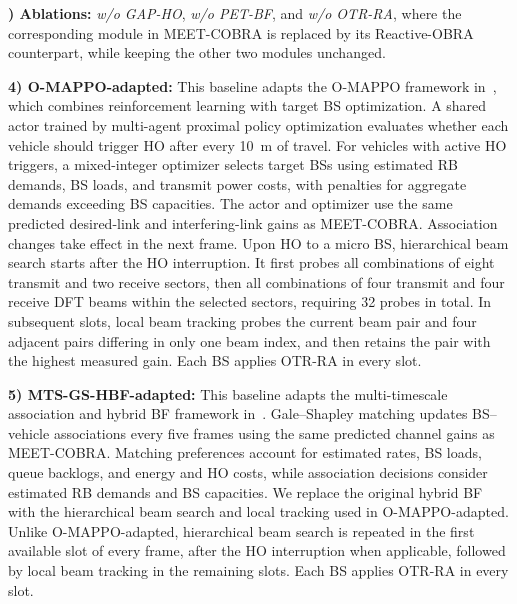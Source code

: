\documentclass[10pt,journal,letterpaper]{journal_template/IEEEtran}
\newcommand{\rev}[1]{\textcolor{revisioncolor}{{}#1}}
\newif\ifshowdeletions
\newcommand{\currentdel}[1]{\ifshowdeletions\textcolor{deletioncolor}{\sout{#1}}\fi}
\theoremstyle{remark}
\begin{document}
\textbf{\currentdel{4}) Ablations:} \emph{w/o GAP-HO}, \emph{w/o PET-BF}, and \emph{w/o OTR-RA}, where the corresponding module in MEET-COBRA is replaced by its Reactive-OBRA counterpart, while keeping the other two modules unchanged.

\rev{\textbf{4) O-MAPPO-adapted:} This baseline adapts the O-MAPPO framework in~\cite{wang2024joint}, which combines reinforcement learning with target BS optimization. A shared actor trained by multi-agent proximal policy optimization evaluates whether each vehicle should trigger HO after every 10~m of travel. For vehicles with active HO triggers, a mixed-integer optimizer selects target BSs using estimated RB demands, BS loads, and transmit power costs, with penalties for aggregate demands exceeding BS capacities. The actor and optimizer use the same predicted desired-link and interfering-link gains as MEET-COBRA. Association changes take effect in the next frame. Upon HO to a micro BS, hierarchical beam search starts after the HO interruption. It first probes all combinations of eight transmit and two receive sectors, then all combinations of four transmit and four receive DFT beams within the selected sectors, requiring 32 probes in total. In subsequent slots, local beam tracking probes the current beam pair and four adjacent pairs differing in only one beam index, and then \rev{retains} the pair with the highest measured gain. Each BS applies OTR-RA in every slot.}

\rev{\textbf{5) MTS-GS-HBF-adapted:} This baseline adapts the multi-timescale association and hybrid BF framework in~\cite{heydarian2025multitimescale}. Gale--Shapley matching updates BS--vehicle associations every five frames using the same predicted channel gains as MEET-COBRA. Matching preferences account for estimated rates, BS loads, queue backlogs, and energy and HO costs, while association decisions consider estimated RB demands and BS capacities. We replace the original hybrid BF with the hierarchical beam search and local tracking used in O-MAPPO-adapted. Unlike O-MAPPO-adapted, hierarchical beam search is repeated in the first available slot of every frame, after the HO interruption when applicable, followed by local beam tracking in the remaining slots. Each BS applies OTR-RA in every slot.}
\end{document}
